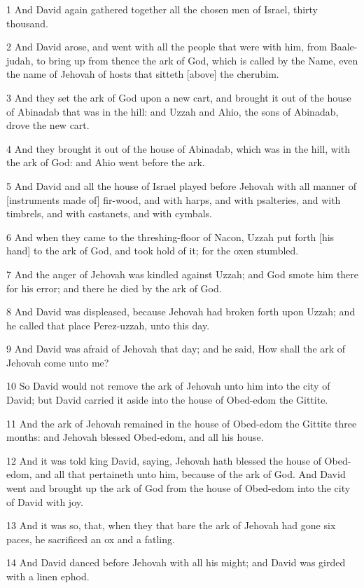\par 1 And David again gathered together all the chosen men of Israel, thirty thousand.
\par 2 And David arose, and went with all the people that were with him, from Baale-judah, to bring up from thence the ark of God, which is called by the Name, even the name of Jehovah of hosts that sitteth [above] the cherubim.
\par 3 And they set the ark of God upon a new cart, and brought it out of the house of Abinadab that was in the hill: and Uzzah and Ahio, the sons of Abinadab, drove the new cart.
\par 4 And they brought it out of the house of Abinadab, which was in the hill, with the ark of God: and Ahio went before the ark.
\par 5 And David and all the house of Israel played before Jehovah with all manner of [instruments made of] fir-wood, and with harps, and with psalteries, and with timbrels, and with castanets, and with cymbals.
\par 6 And when they came to the threshing-floor of Nacon, Uzzah put forth [his hand] to the ark of God, and took hold of it; for the oxen stumbled.
\par 7 And the anger of Jehovah was kindled against Uzzah; and God smote him there for his error; and there he died by the ark of God.
\par 8 And David was displeased, because Jehovah had broken forth upon Uzzah; and he called that place Perez-uzzah, unto this day.
\par 9 And David was afraid of Jehovah that day; and he said, How shall the ark of Jehovah come unto me?
\par 10 So David would not remove the ark of Jehovah unto him into the city of David; but David carried it aside into the house of Obed-edom the Gittite.
\par 11 And the ark of Jehovah remained in the house of Obed-edom the Gittite three months: and Jehovah blessed Obed-edom, and all his house.
\par 12 And it was told king David, saying, Jehovah hath blessed the house of Obed-edom, and all that pertaineth unto him, because of the ark of God. And David went and brought up the ark of God from the house of Obed-edom into the city of David with joy.
\par 13 And it was so, that, when they that bare the ark of Jehovah had gone six paces, he sacrificed an ox and a fatling.
\par 14 And David danced before Jehovah with all his might; and David was girded with a linen ephod.
